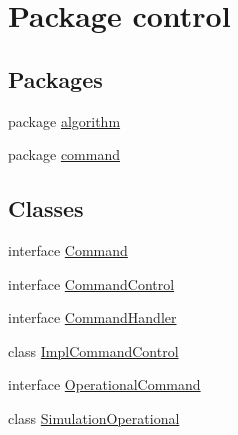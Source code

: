 \hypertarget{namespacecontrol}{}\section{Package control}
\label{namespacecontrol}
\subsection*{Packages}
\begin{DoxyCompactItemize}
\item 
package \mbox{\hyperlink{namespacecontrol_1_1algorithm}{algorithm}}
\item 
package \mbox{\hyperlink{namespacecontrol_1_1command}{command}}
\end{DoxyCompactItemize}
\subsection*{Classes}
\begin{DoxyCompactItemize}
\item 
interface \mbox{\hyperlink{interfacecontrol_1_1_command}{Command}}
\item 
interface \mbox{\hyperlink{interfacecontrol_1_1_command_control}{Command\+Control}}
\item 
interface \mbox{\hyperlink{interfacecontrol_1_1_command_handler}{Command\+Handler}}
\item 
class \mbox{\hyperlink{classcontrol_1_1_impl_command_control}{Impl\+Command\+Control}}
\item 
interface \mbox{\hyperlink{interfacecontrol_1_1_operational_command}{Operational\+Command}}
\item 
class \mbox{\hyperlink{classcontrol_1_1_simulation_operational}{Simulation\+Operational}}
\end{DoxyCompactItemize}

